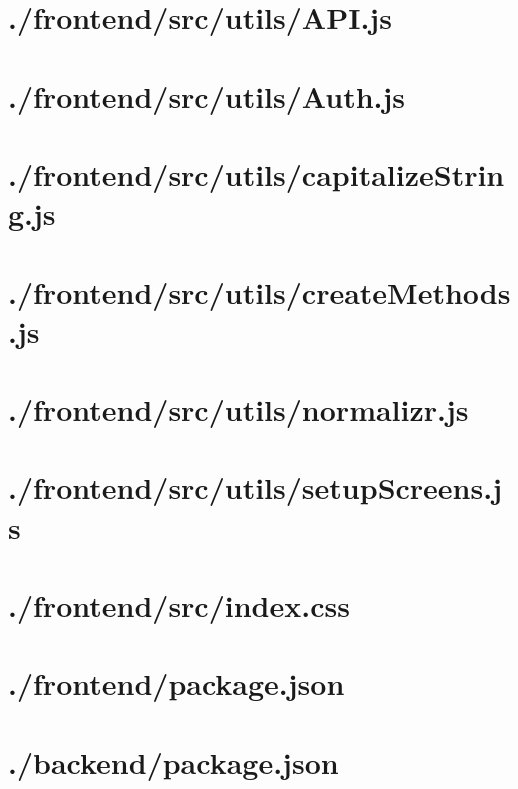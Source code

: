\documentclass[11pt]{informatics-report}
\begin{document}
\newpage
\section{./frontend/src/utils/API.js}


\newpage
\section{./frontend/src/utils/Auth.js}


\newpage
\section{./frontend/src/utils/capitalizeString.js}


\newpage
\section{./frontend/src/utils/createMethods.js}


\newpage
\section{./frontend/src/utils/normalizr.js}


\newpage
\section{./frontend/src/utils/setupScreens.js}


\newpage
\section{./frontend/src/index.css}


\newpage
\section{./frontend/package.json}


\newpage
\section{./backend/package.json}

\end{document}
